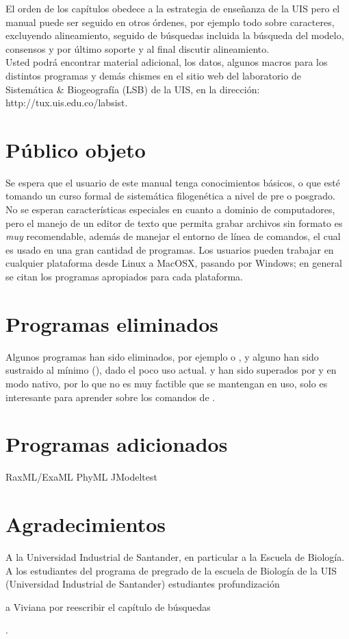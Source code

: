 El orden de los cap\'itulos obedece a la estrategia de ense\~nanza de la UIS pero  el manual puede ser seguido en otros \'ordenes, por ejemplo todo sobre caracteres, excluyendo alineamiento, seguido de b\'usquedas incluida la b\'usqueda del modelo, consensos y por \'ultimo soporte y al final discutir alineamiento.\\ 
Usted podr\'a encontrar material adicional, los datos, algunos macros para los distintos programas y dem\'as chismes en el sitio web del laboratorio de Sistem\'atica \& Biogeograf\'ia (LSB) de la UIS, en la direcci\'on: http://tux.uis.edu.co/labsist.
\section*{P\'ublico objeto}
Se espera que el usuario de este manual tenga conocimientos b\'asicos, o que est\'e tomando un curso formal de sistem\'atica filogen\'etica a nivel de pre o posgrado. No se esperan caracter\'isticas especiales en cuanto a dominio de computadores, pero el manejo de un editor de texto que permita grabar archivos sin formato es \emph{muy} recomendable, adem\'as de manejar el entorno de l\'inea de comandos, el cual es usado en una gran cantidad de programas. Los usuarios pueden trabajar en cualquier plataforma desde Linux a 
MacOSX, pasando por Windows; en general se citan los programas apropiados para cada plataforma.

\section*{Programas eliminados}
Algunos programas han sido eliminados, por ejemplo  o , y alguno han sido sustraido al m\'inimo (), dado el poco uso actual.  y  han sido superados por  y  en modo nativo, por lo que no es muy factible que se mantengan en uso, solo  es interesante para aprender sobre los comandos de .


\section*{Programas adicionados}
RaxML/ExaML
PhyML
JModeltest



\section*{Agradecimientos}
A la Universidad Industrial de Santander, en particular a la Escuela de Biolog\'ia. A los estudiantes del programa de pregrado de la escuela de Biolog\'ia de la UIS (Universidad Industrial de Santander) 
estudiantes profundizaci\'on

a Viviana por reescribir el cap\'itulo de b\'usquedas



.